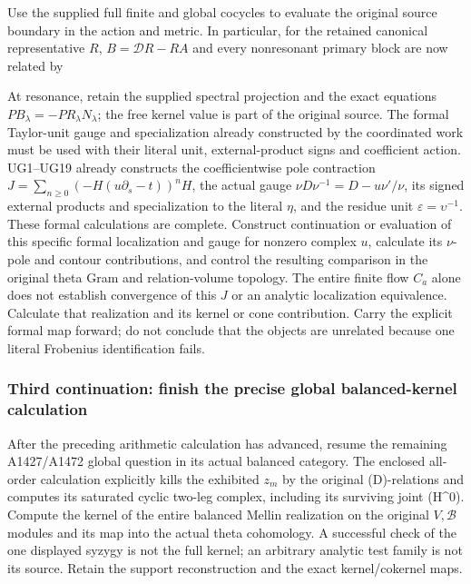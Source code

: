 Use the supplied full finite and global cocycles to evaluate the
original source boundary in the action and metric. In particular, for
the retained canonical representative \(R\), \(B=\mathscr D R-RA\) and
every nonresonant primary block are now related by


At resonance, retain the supplied spectral projection and the exact
equations \(PB_\lambda=-PR_\lambda N_\lambda\); the free kernel value is
part of the original source. The formal Taylor-unit gauge and
specialization already constructed by the coordinated work must be used
with their literal unit, external-product signs and coefficient action.
UG1--UG19 already constructs the coefficientwise pole contraction
\(J=\sum_{n\ge0}(-H(u\partial_s-t))^nH\), the actual gauge
\(\nu D\nu^{-1}=D-u\nu'/\nu\), its signed external products and
specialization to the literal \(\eta\), and the residue unit
\(\varepsilon=\upsilon^{-1}\). These formal calculations are complete.
Construct continuation or evaluation of this specific formal
localization and gauge for nonzero complex \(u\), calculate its
\(\nu\)-pole and contour contributions, and control the resulting
comparison in the original theta Gram and relation-volume topology. The
entire finite flow \(C_a\) alone does not establish convergence of this
\(J\) or an analytic localization equivalence. Calculate that
realization and its kernel or cone contribution. Carry the explicit
formal map forward; do not conclude that the objects are unrelated
because one literal Frobenius identification fails.

\subsubsection{Third continuation: finish the precise global
balanced-kernel
calculation}\label{third-continuation-finish-the-precise-global-balanced-kernel-calculation}

After the preceding arithmetic calculation has advanced, resume the
remaining A1427/A1472 global question in its actual balanced category.
The enclosed all-order calculation explicitly kills the exhibited
\(z_m\) by the original (D)-relations and computes its saturated cyclic
two-leg complex, including its surviving joint (H\^{}0). Compute the
kernel of the entire balanced Mellin realization on the original
\(V,\mathscr B\) modules and its map into the actual theta cohomology. A
successful check of the one displayed syzygy is not the full kernel; an
arbitrary analytic test family is not its source. Retain the support
reconstruction and the exact kernel/cokernel maps.

